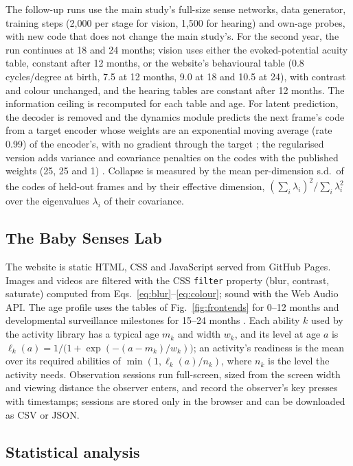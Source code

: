 \documentclass{article}
\begin{document}
The follow-up runs use the main study's full-size sense networks, data generator, training steps (2,000 per stage for vision, 1,500 for hearing) and own-age probes, with new code that does not change the main study's. For the second year, the run continues at 18 and 24 months; vision uses either the evoked-potential acuity table, constant after 12 months, or the website's behavioural table (0.8 cycles/degree at birth, 7.5 at 12 months, 9.0 at 18 and 10.5 at 24), with contrast and colour unchanged, and the hearing tables are constant after 12 months. The information ceiling is recomputed for each table and age. For latent prediction, the decoder is removed and the dynamics module predicts the next frame's code from a target encoder whose weights are an exponential moving average (rate 0.99) of the encoder's, with no gradient through the target \autocite{grill2020bootstrap}; the regularised version adds variance and covariance penalties on the codes with the published weights (25, 25 and 1) \autocite{bardes2022vicreg}. Collapse is measured by the mean per-dimension s.d.\ of the codes of held-out frames and by their effective dimension, $(\sum_i\lambda_i)^2/\sum_i\lambda_i^2$ over the eigenvalues $\lambda_i$ of their covariance.

\subsection{The Baby Senses Lab}

The website is static HTML, CSS and JavaScript served from GitHub Pages. Images and videos are filtered with the CSS \texttt{filter} property (blur, contrast, saturate) computed from Eqs.~\ref{eq:blur}--\ref{eq:colour}; sound with the Web Audio API. The age profile uses the tables of Fig.~\ref{fig:frontends} for 0--12 months and developmental surveillance milestones for 15--24 months \autocite{zubler2022evidence}. Each ability $k$ used by the activity library has a typical age $m_k$ and width $w_k$, and its level at age $a$ is $\ell_k(a) = 1/\big(1+\exp(-(a-m_k)/w_k)\big)$; an activity's readiness is the mean over its required abilities of $\min(1, \ell_k(a)/n_k)$, where $n_k$ is the level the activity needs. Observation sessions run full-screen, sized from the screen width and viewing distance the observer enters, and record the observer's key presses with timestamps; sessions are stored only in the browser and can be downloaded as CSV or JSON.

\subsection{Statistical analysis}
\end{document}
